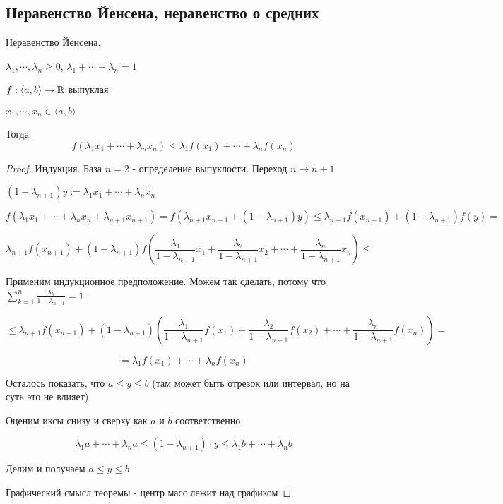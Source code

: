 \subsection{Неравенство Йенсена, неравенство о средних \href{https://youtu.be/CAxh8kYEOlQ?t=8091}{\Walley}}

\begin{theorem-non}
    Неравенство Йенсена.
    
    $\lambda_1, \cdots, \lambda_n \geqslant 0$, 
    $\lambda_1+\cdots+\lambda_n = 1$

    $f: \langle a, b \rangle \to \mathbb{R}$ выпуклая

    $x_1,\cdots, x_n \in \langle a, b \rangle$

    Тогда \[f(\lambda_1x_1+\cdots+\lambda_nx_n)\leqslant \lambda_1f(x_1)+
    \cdots+\lambda_nf(x_n) \]
\end{theorem-non}

\begin{proof}
    Индукция. База $n = 2$ - определение выпуклости. Переход $n \to n+1$

    $ (1-\lambda_{n+1}) y:= \lambda_1x_1+\cdots+\lambda_n x_n$

    \[ f(\lambda_1x_1+\cdots+\lambda_n x_n + \lambda_{n+1}x_{n+1}) = f(\lambda_{n+1}x_{n+1} + (1-\lambda_{n+1})y)
    \leqslant \lambda_{n+1}f(x_{n+1}) + (1-\lambda_{n+1})f(y) = \]

    \[ \lambda_{n+1}f(x_{n+1}) + (1-\lambda_{n+1}) f \left( \frac{\lambda_1}{1-\lambda_{n+1}}x_1 + \frac{\lambda_2}{1-\lambda_{n+1}}x_2+
    \cdots + \frac{\lambda_n}{1-\lambda_{n+1}}x_n \right) \leqslant \]

    Применим индукционное предположение. Можем так сделать, потому что $\sum\limits_{k = 1}^n \frac{\lambda_k}{1 - \lambda_{n + 1}} = 1$.

    \[ \leqslant \lambda_{n+1}f(x_{n+1}) + (1-\lambda_{n+1}) \left( \frac{\lambda_1}{1-\lambda_{n+1}}f(x_1) + \frac{\lambda_2}{1-\lambda_{n+1}}f(x_2)+
    \cdots + \frac{\lambda_n}{1-\lambda_{n+1}}f(x_n) \right) = \]

    \[ = \lambda_1f(x_1)+ \cdots+\lambda_nf(x_n) \]

    Осталось показать, что $a \leq y \leq b$ (там может быть отрезок или интервал, но на суть это не влияет)

    Оценим иксы снизу и сверху как $a$ и $b$ соответственно

    \[ \lambda_1 a+\cdots+\lambda_n a \leq (1-\lambda_{n+1})\cdot y \leq \lambda_1 b+\cdots+\lambda_n b \]

    Делим и получаем $a \leqslant y \leqslant b$

    Графический смысл теоремы - центр масс лежит над графиком
    
\end{proof}

